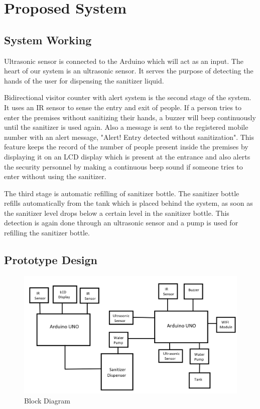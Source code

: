 
\chapter{Proposed System} 

\section{System Working}

 \hspace{0.5cm}Ultrasonic sensor is connected to the Arduino which will act as an input. The heart of our system is an ultrasonic sensor. It serves the purpose of detecting the hands of the user for dispensing the sanitizer liquid.
  
 Bidirectional visitor counter with alert system is the second stage of the system. It uses an IR sensor to sense the entry and exit of people. If a person tries to enter the premises without sanitizing their hands, a buzzer will beep continuously until the sanitizer is used again. Also a message is sent to the registered mobile number with an alert message, "Alert! Entry detected without sanitization". This feature keeps the record of the number of people present inside the premises by displaying it on an LCD display which is present at the entrance and also alerts the security personnel by making a continuous beep sound if someone tries to enter without using the sanitizer.
 
 The third stage is automatic refilling of sanitizer bottle. The sanitizer bottle refills automatically from the tank which is placed behind the system, as soon as the sanitizer level drops below a certain level in the sanitizer bottle. This detection is again done through an ultrasonic sensor and a pump is used for refilling the sanitizer bottle.


\newpage
\section{Prototype Design}
\begin{figure}[h]
		\centering
	\includegraphics[width=150mm,scale=1]{block}
	\caption{Block Diagram}
	\label{Block Diagram}
	\end{figure}
  \vspace{0.5cm}
  
